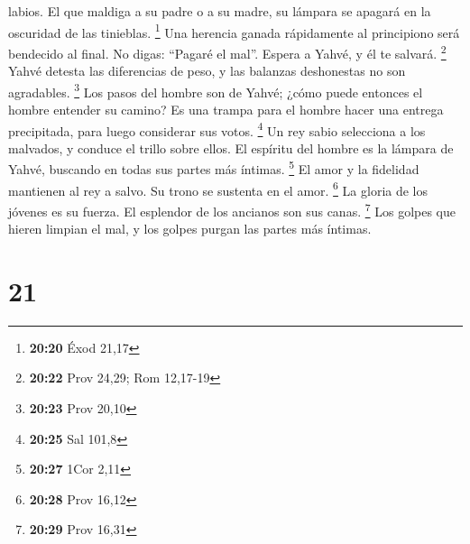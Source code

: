 labios.  El que maldiga a su padre o a su madre, su
lámpara se apagará en la oscuridad de las tinieblas. \footnote{\textbf{20:20}
  Éxod 21,17}  Una herencia ganada rápidamente al
principiono será bendecido al final.  No digas: ``Pagaré
el mal''. Espera a Yahvé, y él te salvará. \footnote{\textbf{20:22} Prov
  24,29; Rom 12,17-19}  Yahvé detesta las diferencias de
peso, y las balanzas deshonestas no son agradables. \footnote{\textbf{20:23}
  Prov 20,10}  Los pasos del hombre son de Yahvé; ¿cómo
puede entonces el hombre entender su camino?  Es una
trampa para el hombre hacer una entrega precipitada, para luego
considerar sus votos. \footnote{\textbf{20:25} Sal 101,8}
 Un rey sabio selecciona a los malvados, y conduce el
trillo sobre ellos.  El espíritu del hombre es la lámpara
de Yahvé, buscando en todas sus partes más íntimas. \footnote{\textbf{20:27}
  1Cor 2,11}  El amor y la fidelidad mantienen al rey a
salvo. Su trono se sustenta en el amor. \footnote{\textbf{20:28} Prov
  16,12}  La gloria de los jóvenes es su fuerza. El
esplendor de los ancianos son sus canas. \footnote{\textbf{20:29} Prov
  16,31}  Los golpes que hieren limpian el mal, y los
golpes purgan las partes más íntimas.

\hypertarget{section-20}{%
\section{21}\label{section-20}}

